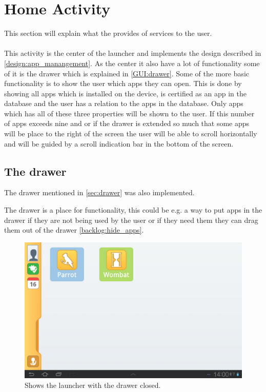 \section{Home Activity}
This section will explain what the  provides of services to the user.\\\\

This activity is the center of the launcher and implements the design described in \autoref{design:app_manangement}. As the center it also have a lot of functionality some of it is the drawer which is explained in \autoref{GUI:drawer}. 
Some of the more basic functionality is to show the user which apps they can open. This is done by showing all apps which is installed on the device, is certified as an app in the database and the user has a relation to the apps in the database. Only apps which has all of these three properties will be shown to the user. If this number of apps exceeds nine and or if the drawer is extended so much that some apps will be place to the right of the screen the user will be able to scroll horizontally and will be guided by a scroll indication bar in the bottom of the screen.

\subsection{The drawer}
The drawer mentioned in \autoref{sec:drawer} was also implemented.

The drawer is a place for functionality, this could be e.g. a way to put apps in the drawer if they are not being used by the user or if they need them they can drag them out of the drawer \autoref{backlog:hide_apps}.

\begin{figure}[h!]
	\centering
	\includegraphics[scale=0.2]{gfx/home-activity_closed}
	\caption{Shows the launcher with the drawer closed.}
	\label{fig:home-activity_closed}
\end{figure}

